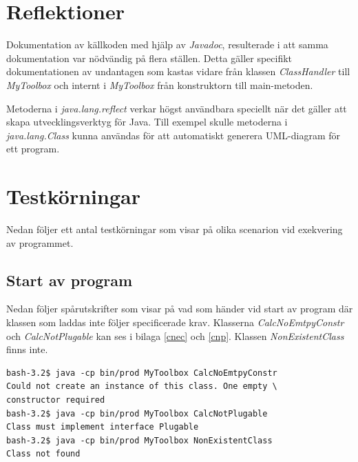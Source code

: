 \documentclass[a4paper, 12pt]{article}
\begin{document}

\section{Reflektioner}

Dokumentation av källkoden med hjälp av \textit{Javadoc}, resulterade
i att samma dokumentation var nödvändig på flera ställen. Detta gäller
specifikt dokumentationen av undantagen som kastas vidare från klassen
\textit{ClassHandler} till \textit{MyToolbox} och internt i
\textit{MyToolbox} från konstruktorn till main-metoden.

Metoderna i \textit{java.lang.reflect} verkar högst användbara
speciellt när det gäller att skapa utvecklingsverktyg för Java. Till
exempel skulle metoderna i \textit{java.lang.Class} kunna användas för
att automatiskt generera UML-diagram för ett program.

\section{Testkörningar}
Nedan följer ett antal testkörningar som visar på olika scenarion vid
exekvering av programmet.

\subsection{Start av program}
Nedan följer spårutskrifter som visar på vad som händer vid start av
program där klassen som laddas inte följer specificerade
krav. Klasserna \textit{CalcNoEmtpyConstr} och
\textit{CalcNotPlugable} kan ses i bilaga \ref{cnec} och
\ref{cnp}. Klassen \textit{NonExistentClass} finns inte.

\begin{verbatim}
bash-3.2$ java -cp bin/prod MyToolbox CalcNoEmtpyConstr
Could not create an instance of this class. One empty \
constructor required
bash-3.2$ java -cp bin/prod MyToolbox CalcNotPlugable
Class must implement interface Plugable
bash-3.2$ java -cp bin/prod MyToolbox NonExistentClass
Class not found
\end{verbatim}
\end{document}
